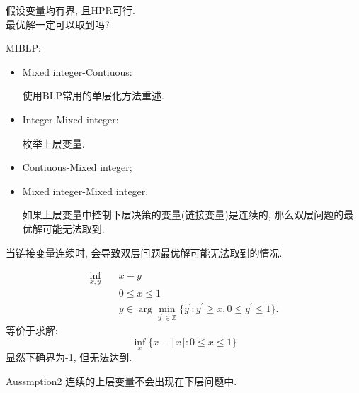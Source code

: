 \documentclass[10pt]{beamer}
\begin{document}
\begin{frame}
	\begin{tcolorbox}
		假设变量均有界, 且HPR可行.\\
		最优解一定可以取到吗?
	\end{tcolorbox}
	MIBLP:
	\begin{itemize}
		\item Mixed integer-Contiuous:
		
		使用BLP常用的单层化方法重述.
		\item Integer-Mixed integer:
		
		枚举上层变量.
		\item Contiuous-Mixed integer;
		\item Mixed integer-Mixed integer.
		
		如果上层变量中控制下层决策的变量(链接变量)是连续的, 那么双层问题的最优解可能无法取到.
	\end{itemize}
\end{frame}

\begin{frame}
	当链接变量连续时, 会导致双层问题最优解可能无法取到的情况. 
	\begin{tcolorbox}
		\begin{equation*}
			\begin{aligned}
				\inf_{x,y}&\quad x-y\\
				&\quad0\leq x\leq1\\
				&\quad y\in\arg\min_{y^{\prime}\in\mathbb{Z}}\{y^{\prime}:y^{\prime}\geq x,0\leq y^{\prime}\leq1\}.
			\end{aligned}
		\end{equation*}
		等价于求解:
		\begin{equation*}
			\inf_x\{x-\lceil x\rceil:0\leq x\leq1\}
		\end{equation*}
		显然下确界为-1, 但无法达到.
	\end{tcolorbox}

	\begin{block}{Aussmption2}
		连续的上层变量不会出现在下层问题中.
	\end{block}
\end{frame}
\end{document}
